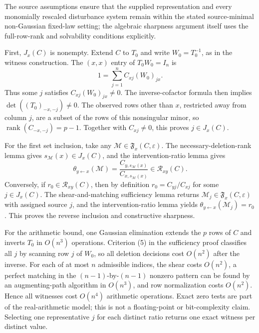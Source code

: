The source assumptions ensure that the supplied representation and every monomially rescaled disturbance system remain within the stated source-minimal non-Gaussian fixed-law setting; the algebraic sharpness argument itself uses the full-row-rank and solvability conditions explicitly.

First, \(J_x(C)\) is nonempty. Extend \(C\) to \(T_0\) and write \(W_0=T_0^{-1}\), as in the witness construction. The \((x,x)\) entry of \(T_0W_0=I_n\) is
\[
 1=\sum_{j=1}^n C_{xj}(W_0)_{jx}. \tag{10}
\]
Thus some \(j\) satisfies \(C_{xj}(W_0)_{jx}\ne0\). The inverse-cofactor formula then implies \(\det((T_0)_{-x,-j})\ne0\). The observed rows other than \(x\), restricted away from column \(j\), are a subset of the rows of this nonsingular minor, so \(\operatorname{rank}(C_{-x,-j})=p-1\). Together with \(C_{xj}\ne0\), this proves \(j\in J_x(C)\).

For the first set inclusion, take any \(\mathcal M\in\mathfrak F_x(C,\varepsilon)\). The necessary-deletion-rank lemma gives \(s_{\mathcal M}(x)\in J_x(C)\), and the intervention-ratio lemma gives
\[
 \theta_{y\leftarrow x}(\mathcal M)
 =\frac{C_{y,s_{\mathcal M}(x)}}{C_{x,s_{\mathcal M}(x)}}
 \in\mathcal R_{xy}(C). \tag{11}
\]
Conversely, if \(r_0\in\mathcal R_{xy}(C)\), then by definition \(r_0=C_{yj}/C_{xj}\) for some \(j\in J_x(C)\). The shear-and-matching sufficiency lemma returns \(\mathcal M_j\in\mathfrak F_x(C,\varepsilon)\) with assigned source \(j\), and the intervention-ratio lemma yields \(\theta_{y\leftarrow x}(\mathcal M_j)=r_0\). This proves the reverse inclusion and constructive sharpness.

For the arithmetic bound, one Gaussian elimination extends the \(p\) rows of \(C\) and inverts \(T_0\) in \(O(n^3)\) operations. Criterion (5) in the sufficiency proof classifies all \(j\) by scanning row \(j\) of \(W_0\), so all deletion decisions cost \(O(n^2)\) after the inverse. For each of at most \(n\) admissible indices, the shear costs \(O(n^2)\), a perfect matching in the \((n-1)\)-by-\((n-1)\) nonzero pattern can be found by an augmenting-path algorithm in \(O(n^3)\), and row normalization costs \(O(n^2)\). Hence all witnesses cost \(O(n^4)\) arithmetic operations. Exact zero tests are part of the real-arithmetic model; this is not a floating-point or bit-complexity claim. Selecting one representative \(j\) for each distinct ratio returns one exact witness per distinct value.